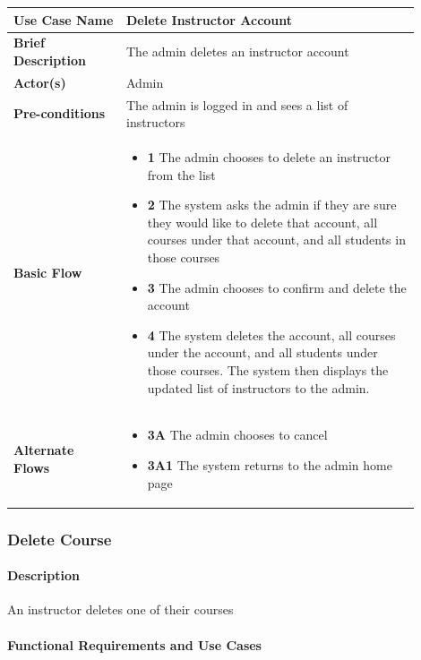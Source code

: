 \documentclass{article}
\begin{document}
\begin{tabular}{| p{0.25\linewidth} | p{0.65\linewidth} |}
  \hline
  \textbf{Use Case Name} & Delete Instructor Account \\
  \hline
  \textbf{Brief Description} & The admin deletes an instructor account \\
  \hline
  \textbf{Actor(s)} & Admin \\
  \hline
  \textbf{Pre-conditions} & The admin is logged in and sees a list of instructors\\
  \hline
  \textbf{Basic Flow} & \begin{itemize}
    \item[] \textbf{1} The admin chooses to delete an instructor from the list
    \item[] \textbf{2} The system asks the admin if they are sure they would like to delete that account, all courses under that account, and all students in those courses
    \item[] \textbf{3} The admin chooses to confirm and delete the account
    \item[] \textbf{4} The system deletes the account, all courses under the account, and all students under those courses. The system then displays the updated list of instructors to the admin.
  \end{itemize}\\
  \hline
  \textbf{Alternate Flows} & \begin{itemize}
    \item[] \textbf{3A} The admin chooses to cancel
    \item[] \textbf{3A1} The system returns to the admin home page
  \end{itemize}\\
  \hline
\end{tabular}

\subsubsection{Delete Course}

\paragraph{Description} An instructor deletes one of their courses

\paragraph{Functional Requirements and Use Cases}
\end{document}
